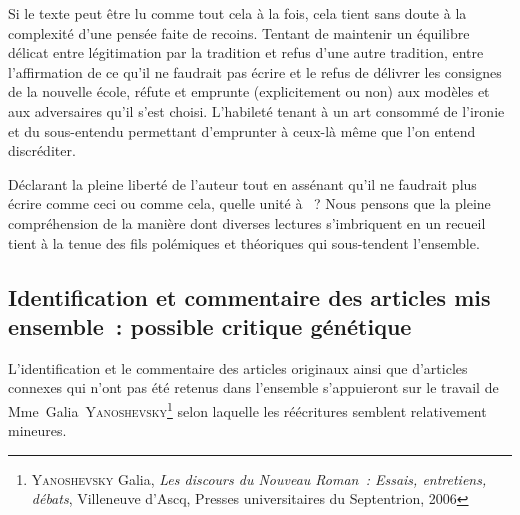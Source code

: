 \documentclass[12pt, a4paper]{article}
\begin{document}
Si le texte peut être lu comme tout cela à la fois, cela tient sans doute à la complexité d'une pensée faite de recoins. Tentant de maintenir un équilibre délicat entre légitimation par la tradition et refus d'une autre tradition, entre l'affirmation de ce qu'il ne faudrait pas écrire et le refus de délivrer les consignes de la nouvelle école, \punr{} réfute et emprunte (explicitement ou non) aux modèles et aux adversaires qu'il s'est choisi. L'habileté tenant à un art consommé de l'ironie et du sous-entendu permettant d'emprunter à ceux-là même que l'on entend discréditer.

Déclarant la pleine liberté de l'auteur tout en assénant qu'il ne faudrait plus écrire comme ceci ou comme cela, quelle unité à \punr~? Nous pensons que la pleine compréhension de la manière dont diverses lectures s'imbriquent en un recueil tient à la tenue des fils polémiques et théoriques qui sous-tendent l'ensemble.



    \subsection{Identification et commentaire des articles mis ensemble~: possible critique génétique}
    L'identification et le commentaire des articles originaux ainsi que d'articles connexes qui n'ont pas été retenus dans l'ensemble s'appuieront sur le travail de Mme~Galia~\textsc{Yanoshevsky}\footnote{\textsc{Yanoshevsky} Galia, \textit{Les discours du Nouveau Roman : Essais, entretiens, débats}, Villeneuve d'Ascq, Presses universitaires du Septentrion, 2006} selon laquelle les réécritures semblent relativement mineures. 
    

    
\newpage
\end{document}
